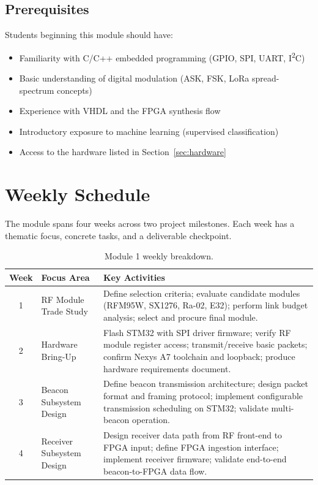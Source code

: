 \documentclass[11pt,letterpaper]{article}
\begin{document}
	\subsection{Prerequisites}
	
	Students beginning this module should have:
	\begin{itemize}[leftmargin=2em]
		\item Familiarity with C/C++ embedded programming (GPIO, SPI, UART, I\textsuperscript{2}C)
		\item Basic understanding of digital modulation (ASK, FSK, LoRa spread-spectrum concepts)
		\item Experience with VHDL and the FPGA synthesis flow
		\item Introductory exposure to machine learning (supervised classification)
		\item Access to the hardware listed in Section~\ref{sec:hardware}
	\end{itemize}
	
	\newpage
	\section{Weekly Schedule}
	
	The module spans four weeks across two project milestones. Each week has a thematic focus, concrete tasks, and a deliverable checkpoint.
	
	\begin{table}[ht!]
		\centering
		\caption{Module 1 weekly breakdown.}
		\label{tab:schedule}
		\renewcommand{\arraystretch}{1.4}
		\begin{tabularx}{\textwidth}{c l X}
			\toprule
			\textbf{Week} & \textbf{Focus Area} & \textbf{Key Activities} \\
			\midrule
			1 & RF Module Trade Study &
			Define selection criteria; evaluate candidate modules (RFM95W, SX1276, Ra-02, E32); perform link budget analysis; select and procure final module. \\
			2 & Hardware Bring-Up &
			Flash STM32 with SPI driver firmware; verify RF module register access; transmit/receive basic packets; confirm Nexys A7 toolchain and loopback; produce hardware requirements document. \\
			3 & Beacon Subsystem Design &
			Define beacon transmission architecture; design packet format and framing protocol; implement configurable transmission scheduling on STM32; validate multi-beacon operation. \\
			4 & Receiver Subsystem Design &
			Design receiver data path from RF front-end to FPGA input; define FPGA ingestion interface; implement receiver firmware; validate end-to-end beacon-to-FPGA data flow. \\
			\bottomrule
		\end{tabularx}
	\end{table}
	
\end{document}

